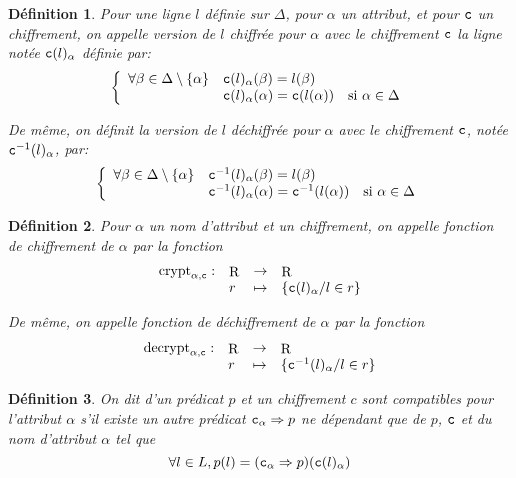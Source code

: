 \documentclass[french]{article}
\DeclareMathOperator{\crypt}{crypt}
\DeclareMathOperator{\decrypt}{decrypt}
\DeclareMathOperator{\R}{R}
\newcommand\typeT[1]{\text{\ttfamily #1}}
\newcommand{\decryptArgs}[2]{\decrypt_{#1 , \typeT{#2}}}
\newcommand{\cryptArgs}[2]{\crypt_{#1 , \typeT{#2}}}
\newcommand{\decryptCAlpha}{\decryptArgs{\alpha}{c}}
\newcommand{\cryptCAlpha}{\cryptArgs{\alpha}{c}}
\newcommand{\cy}[1]{\typeT{c}(#1)}
\newcommand{\dc}[1]{\typeT{c}^{-1}(#1)}
\newtheorem{defi}{Définition}
\begin{document}
\begin{defi}
	Pour une ligne $l$ définie sur $\Delta$, pour $\alpha$ un attribut,
	et pour $\typeT{c}$ un chiffrement,
	on appelle \emph{version de $l$ chiffrée pour $\alpha$ avec le chiffrement
		$\typeT{c}$}
	la ligne notée $\cy{l}_\alpha$ définie par:
	$$
	\left\lbrace
	\begin{array}{lll}
	\forall \beta \in \Delta \setminus \{\alpha\} & \cy{l}_\alpha(\beta) = l(\beta) & \\
	& \cy{l}_\alpha(\alpha) = \cy{l(\alpha)} & \text{si $\alpha \in \Delta$}
	\end{array}
	\right.
	$$
	
	De même, on définit la \emph{version de $l$ déchiffrée pour $\alpha$ avec le chiffrement
		$\typeT{c}$}, notée $\dc{l}_\alpha$, par:
	$$
	\left\lbrace
	\begin{array}{lll}
	\forall \beta \in \Delta \setminus \{\alpha\} & \dc{l}_\alpha(\beta) = l(\beta) & \\
	& \dc{l}_\alpha(\alpha) = \dc{l(\alpha)} & \text{si $\alpha \in \Delta$}
	\end{array}
	\right.
	$$
\end{defi}

\begin{defi}
	Pour $\alpha$ un nom d'attribut
	et \typeT{c} un chiffrement,
	on appelle \emph{fonction de chiffrement de $\alpha$ par \typeT{c}}
	la fonction
	$$
	\begin{array}{llcl}
	\cryptCAlpha : & \R & \rightarrow & \R \\
		&	r	&	\mapsto & \{ \cy{l}_\alpha / l \in r \}
	\end{array}
	$$
	
	De même, on appelle \emph{fonction de déchiffrement de $\alpha$ par \typeT{c}}
	la fonction
	$$
	\begin{array}{llcl}
	\decryptCAlpha : & \R & \rightarrow & \R \\
	&	r	&	\mapsto & \{ \dc{l}_\alpha / l \in r \}
	\end{array}
	$$
\end{defi}

\begin{defi}
	On dit d'un prédicat $p$ et un chiffrement $c$ sont compatibles
	pour l'attribut $\alpha$
	s'il existe un autre prédicat $\typeT{c}_\alpha \Rightarrow p$
	ne dépendant que de $p$, $\typeT{c}$ et du nom d'attribut $\alpha$ tel que
	$$
	\forall l \in L,
	p(l) = (\typeT{c}_\alpha \Rightarrow p)(\cy{l}_\alpha)
	$$
\end{defi}
\end{document}
